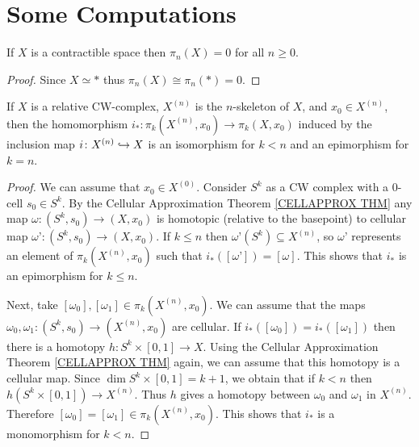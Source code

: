 

\chapter[Some Computations]{Some Computations}
\label{SOME COMPUTATIONS CHAPTER}
\thispagestyle{firststyle}

\begin{proposition}
If $X$ is a contractible space then $\pi_{n}(X) = 0$ for all 
$n\geq 0$.  
\end{proposition}

\begin{proof}
Since $X\simeq \ast$ thus $\pi_{n}(X) \cong \pi_{n}(\ast) = 0$.
\end{proof}

\begin{proposition}
\label{PIN FOR CW SKELETON PROP}
If $X$ is a relative CW-complex, $X^{(n)}$ is the $n$-skeleton of $X$, and $x_{0}\in X^{(n)}$, 
then the homomorphism $i_{\ast}\colon \pi_{k}(X^{(n)}, x_{0}) \to \pi_{k}(X, x_{0})$
induced by the inclusion map $i\colon X^{(n)}\hookrightarrow X$ is  an isomorphism for $k< n$
and an epimorphism for $k=n$.
\end{proposition}

\begin{proof}
We can assume that $x_{0}\in X^{(0)}$. Consider $S^{k}$ as a CW complex with 
a 0-cell $s_{0}\in S^{k}$. By the Cellular Approximation Theorem \ref{CELLAPPROX THM}
any map $\omega\colon (S^{k}, s_{0}) \to (X, x_{0})$ is homotopic (relative to the basepoint)
to cellular map $\omega’\colon (S^{k}, s_{0}) \to (X, x_{0})$. If $k \leq n$ then 
$\omega’(S^{k})\subseteq X^{(n)}$, so $\omega’$ represents an element of 
$\pi_{k}(X^{(n)}, x_{0})$ such that $i_{\ast}([\omega’]) = [\omega]$. This shows that 
$i_{\ast}$ is an epimorphism for $k\leq n$. 

Next, take $[\omega_{0}], [\omega_{1}] \in \pi_{k}(X^{(n)}, x_{0})$. We can assume that 
the maps $\omega_{0}, \omega_{1} \colon (S^{k}, s_{0}) \to (X^{(n)}, x_{0})$ are cellular.
If $i_{\ast}([\omega_{0}]) = i_{\ast}([\omega_{1}])$ then there is a homotopy 
$h\colon S^{k}\times [0, 1] \to X$. Using the Cellular Approximation Theorem 
\ref{CELLAPPROX THM} again, we can assume that this homotopy is a cellular map. 
Since $\dim S^{k}\times [0, 1] = k+1$, we obtain that if $k < n$ then
$h(S^{k}\times [0, 1]) \to X^{(n)}$. Thus $h$ gives a homotopy between $\omega_{0}$
and $\omega_{1}$ in $X^{(n)}$. 
Therefore $[\omega_{0}] = [\omega_{1}] \in \pi_{k}(X^{(n)}, x_{0})$. 
This shows that $i_{\ast}$ is a monomorphism for $k < n$. 
\end{proof}


